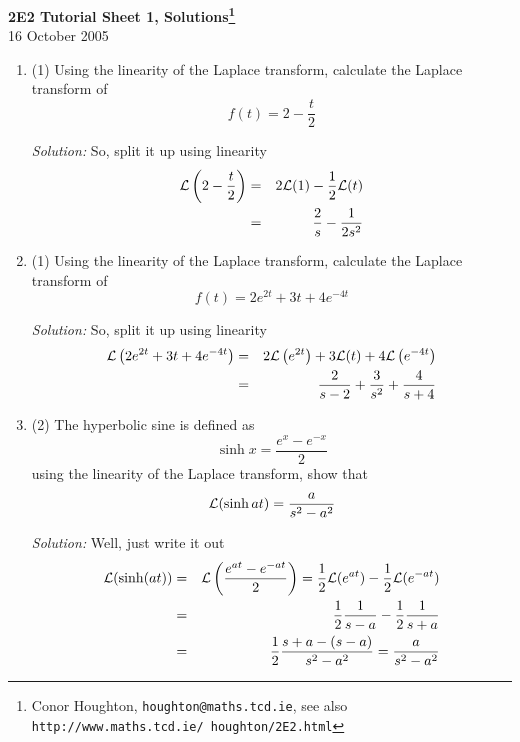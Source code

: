 \documentclass[12pt]{article}
\begin{document}
\begin{center}
{\bf 2E2 Tutorial Sheet 1, Solutions\footnote{Conor Houghton, {\tt houghton@maths.tcd.ie}, see also {\tt http://www.maths.tcd.ie/ houghton/2E2.html}}}\\[1cm]{} 16 October 2005
\end{center}


\renewcommand{\labelenumi}{\arabic{enumi}.}
\begin{enumerate}


\item (1) Using the linearity of the Laplace transform, calculate the
Laplace transform of
\begin{equation}
f(t)=2-\frac{t}{2}
\end{equation}

\noindent\textit{Solution:} So, split it up using linearity
\begin{eqnarray}
{\cal L}\left(2-\frac{t}{2}\right)&=&2{\cal L}(1)-\frac{1}{2}{\cal L}(t)\cr
&=&\frac{2}{s}-\frac{1}{2s^2}
\end{eqnarray}

\item (1) Using the linearity of the Laplace transform, calculate the
Laplace transform of
\begin{equation}
f(t)=2e^{2t}+3t+4e^{-4t}
\end{equation}

\noindent\textit{Solution:} So, split it up using linearity
\begin{eqnarray}
{\cal L}\left(2e^{2t}+3t+4e^{-4t}\right)&=&2{\cal L}\left(e^{2t}\right)+3{\cal L}(t)+4{\cal L}\left(e^{-4t}\right)\cr
&=&\frac{2}{s-2}+\frac{3}{s^2}+\frac{4}{s+4}
\end{eqnarray}

\item (2)
The hyperbolic sine is defined as
\begin{equation}
\sinh{x}=\frac{e^x-e^{-x}}{2}
\end{equation}
using the linearity of the Laplace transform, show that
\begin{equation}
{\cal L}(\sinh{at})=\frac{a}{s^2-a^2}
\end{equation}

\noindent\textit{Solution:} Well, just write it out
\begin{eqnarray}
{\cal L}(\sinh(at))&=&{\cal L}\left(\frac{e^{at}-e^{-at}}{2}   \right)=\frac{1}{2}{\cal L}(e^{at})-\frac{1}{2}{\cal L}(e^{-at})\cr
&=&\frac{1}{2}\frac{1}{s-a}-\frac{1}{2}\frac{1}{s+a}\cr
&=&\frac{1}{2}\frac{s+a-(s-a)}{s^2-a^2}=\frac{a}{s^2-a^2}
\end{eqnarray}


\end{enumerate}
\end{document}
